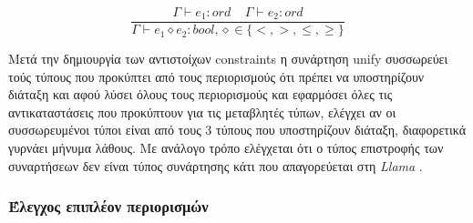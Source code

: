 \documentclass[12pt]{article}
\newcommand{\Llama}{\textit{Llama }}
\begin{document}
$$\frac{\Gamma  \vdash e_1 : ord \;\;\;\; \Gamma  \vdash e_2 : ord  }{\Gamma  \vdash e_1 \diamond e_2 : bool,\diamond \in \lbrace <,>, \leq, \geq\rbrace}$$


Μετά την δημιουργία των αντιστοίχων constraints η συνάρτηση unify συσσωρεύει τούς τύπους που προκύπτει από τους περιορισμούς ότι πρέπει να υποστηρίζουν διάταξη και αφού λύσει όλους τους περιορισμούς και εφαρμόσει όλες τις αντικαταστάσεις που προκύπτουν για τις μεταβλητές τύπων, ελέγχει αν οι συσσωρευμένοι τύποι είναι από τους 3 τύπους που υποστηρίζουν διάταξη, διαφορετικά γυρνάει μήνυμα λάθους. Με ανάλογο τρόπο ελέγχεται ότι ο τύπος επιστροφής των συναρτήσεων δεν είναι τύπος συνάρτησης κάτι που απαγορεύεται στη \Llama. 


\subsubsection{Έλεγχος επιπλέον περιορισμών}
\end{document}
